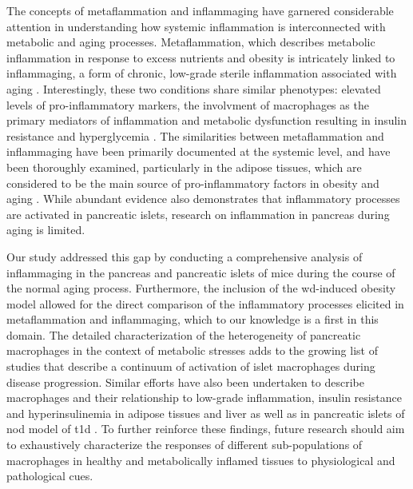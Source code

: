 \par The concepts of metaflammation and inflammaging have garnered considerable attention in understanding how systemic inflammation is interconnected with metabolic and aging processes. Metaflammation, which describes metabolic inflammation in response to excess nutrients and obesity is intricately linked to inflammaging, a form of chronic, low-grade sterile inflammation associated with aging \textbf{\cite{prattichizzo_inflammageing_2018,franceschi_inflammaging_2018}}. Interestingly, these two conditions share similar phenotypes: elevated levels of pro-inflammatory markers, the involvment of macrophages as the primary mediators of inflammation and metabolic dysfunction resulting in insulin resistance and hyperglycemia \textbf{\cite{prattichizzo_inflammageing_2018}}. The similarities between metaflammation and inflammaging have been primarily documented at the systemic level, and have been thoroughly examined, particularly in the adipose tissues, which are considered to be the main source of pro-inflammatory factors in obesity and aging \textbf{\cite{prattichizzo_inflammageing_2018,hotamisligil_inflammation_2017}}. While abundant evidence also demonstrates that inflammatory processes are activated in pancreatic islets, research on inflammation in pancreas during aging is limited.\\
\par Our study addressed this gap by conducting a comprehensive analysis of inflammaging in the pancreas and pancreatic islets of mice during the course of the normal aging process. Furthermore, the inclusion of the \gls{wd}-induced obesity model allowed for the direct comparison of the inflammatory processes elicited in metaflammation and inflammaging, which to our knowledge is a first in this domain. The detailed characterization of the heterogeneity of pancreatic macrophages in the context of metabolic stresses adds to the growing list of studies that describe a continuum of activation of islet macrophages during disease progression. Similar efforts have also been undertaken to describe macrophages and their relationship to low-grade inflammation, insulin resistance and hyperinsulinemia in adipose tissues and liver as well as in pancreatic islets of \gls{nod} model of \gls{t1d} \textbf{\cite{zakharov_single-cell_2020}}. To further reinforce these findings, future research should aim to exhaustively characterize the responses of different sub-populations of macrophages in healthy and metabolically inflamed tissues to physiological and pathological cues.\\


